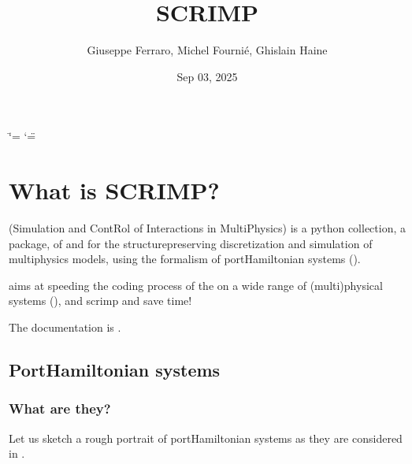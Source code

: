 \documentclass[letterpaper,10pt,english]{sphinxmanual}
\title{SCRIMP}
\date{Sep 03, 2025}
\author{Giuseppe Ferraro, Michel Fournié, Ghislain Haine}
\let\sphinxpxdimen\pdfpxdimen\else\newdimen\sphinxpxdimen
\begin{document}
\ifdefined\shorthandoff
  \ifnum\catcode`\=\string=\active\shorthandoff{=}\fi
  \ifnum\catcode`\"=\active{}\fi
\fi

\pagestyle{empty}
\sphinxmaketitle
\pagestyle{plain}
\sphinxtableofcontents
\pagestyle{normal}
\label{\detokenize{index::doc}}


\sphinxAtStartPar
{}

\noindent{\hspace*{\fill}\sphinxincludegraphics[width=600\sphinxpxdimen,height=200\sphinxpxdimen]{{workflow}.png}\hspace*{\fill}}


\chapter{What is SCRIMP?}
\label{\detokenize{index:what-is-scrimp}}
\sphinxAtStartPar
{} (Simulation and ContRol of Interactions in Multi\sphinxhyphen{}Physics) is a python collection,  a package, of  and  for the structure\sphinxhyphen{}preserving discretization and simulation of multi\sphinxhyphen{}physics models, using the formalism of port\sphinxhyphen{}Hamiltonian systems ().

\sphinxAtStartPar
{} aims at speeding the coding process of the  on a wide range of (multi\sphinxhyphen{})physical systems (), and scrimp and save time!

\sphinxAtStartPar
The documentation is .


\section{Port\sphinxhyphen{}Hamiltonian systems}
\label{\detokenize{index:port-hamiltonian-systems}}

\subsection{What are they?}
\label{\detokenize{index:what-are-they}}
\sphinxAtStartPar
Let us sketch a rough portrait of port\sphinxhyphen{}Hamiltonian systems as they are considered in .
\end{document}
